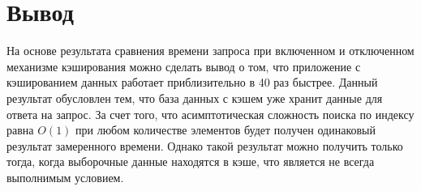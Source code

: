 \begin{table}[H]
	\centering
	\caption{Результаты сравнения времени выполнения запроса при включенном и отключенном механизме кэширования}
	\label{tbl:experiment1}
\end{table}

\section*{Вывод}

На основе результата сравнения времени запроса при включенном и отключенном механизме кэширования можно сделать вывод о том, что приложение с кэшированием данных работает приблизительно в 40 раз быстрее. Данный результат обусловлен тем, что база данных с кэшем уже хранит данные для ответа на запрос. За счет того, что асимптотическая сложность поиска по индексу равна $O(1)$ при любом количестве элементов будет получен одинаковый результат замеренного времени. Однако такой результат можно получить только тогда, когда выборочные данные находятся в кэше, что является не всегда выполнимым условием. 